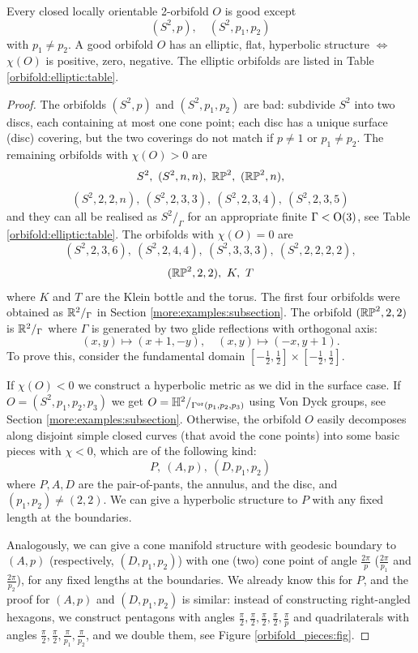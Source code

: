 \begin{teo} \label{O:geometrisation:teo}
Every closed locally orientable 2-orbifold $O$ is good except
$$(S^2, p), \quad (S^2,p_1,p_2)$$
with $p_1 \neq p_2$. A good orbifold $O$ has an elliptic, flat, hyperbolic structure $\Longleftrightarrow$ $\chi(O)$ is positive, zero, negative. The elliptic orbifolds are listed in Table \ref{orbifold:elliptic:table}.
\end{teo}
\begin{proof}
The orbifolds $(S^2, p)$ and $(S^2,p_1,p_2)$ are bad: subdivide $S^2$ into two discs, each containing at most one cone point; each disc has a unique surface (disc) covering, but the two coverings do not match if $p\neq 1$ or $p_1\neq p_2$.
The remaining orbifolds with $\chi(O)>0$ are 
$$S^2,\ (S^2, n, n),\ \matRP^2,\ (\matRP^2, n),$$ 
$$(S^2, 2, 2, n),\ (S^2, 2, 3, 3),\ (S^2, 2, 3, 4),\ (S^2, 2, 3, 5)$$
and they can all be realised as $S^2/_\Gamma$ for an appropriate finite $\Gamma < {\rm O}(3)$, see Table \ref{orbifold:elliptic:table}. The orbifolds with $\chi(O)=0$ are
$$(S^2, 2,3,6), \ (S^2,2,4,4),\ (S^2, 3,3,3),\ (S^2, 2,2,2,2),$$
$$(\mathbb{RP}^2, 2,2),\ K,\ T$$
where $K$ and $T$ are the Klein bottle and the torus. The first four orbifolds were obtained as $\mathbb{R}^2/_\Gamma$ in Section \ref{more:examples:subsection}. The orbifold $(\mathbb{RP}^2, 2,2)$ is $\mathbb{R}^2/_\Gamma$ where $\Gamma$ is generated by two glide reflections with orthogonal axis:
$$(x,y) \mapsto (x+1, -y), \quad (x,y) \mapsto (-x, y+1).$$
To prove this, consider the fundamental domain $[-\frac 12, \frac 12]\times [-\frac 12, \frac 12]$.

If $\chi(O)<0$ we construct a hyperbolic metric as we did in the surface case. If $O = (S^2, p_1, p_2, p_3)$ we get $O = \mathbb{H}^2/_{\Gamma^{\rm or}(p_1,p_2,p_3)}$ using Von Dyck groups, see Section \ref{more:examples:subsection}. Otherwise, the orbifold $O$ easily decomposes along disjoint simple closed curves (that avoid the cone points) into some basic pieces with $\chi<0$, which are of the following kind: 
$$P,\ (A, p),\ (D, p_1, p_2)$$
where $P,A,D$ are the pair-of-pants, the annulus, and the disc, and $(p_1,p_2)\neq (2,2)$. We can give a hyperbolic structure to $P$ with any fixed length at the boundaries. 

Analogously, we can give a cone manifold structure with geodesic boundary to $(A,p)$ (respectively, $(D,p_1,p_2)$) with one (two) cone point of angle $\frac{2\pi}p$ ($\frac{2\pi}{p_1}$ and $\frac{2\pi}{p_2}$), for any fixed lengths at the boundaries. We already know this for $P$, and the proof for $(A,p)$ and $(D,p_1,p_2)$ is similar: instead of constructing right-angled hexagons, we construct pentagons with angles $\frac \pi 2, \frac \pi 2, \frac \pi 2, \frac \pi 2, \frac \pi p$ and quadrilaterals with angles $\frac \pi 2, \frac \pi 2, \frac \pi {p_1}, \frac \pi {p_2}$, and we double them, see Figure \ref{orbifold_pieces:fig}.


\end{proof}
